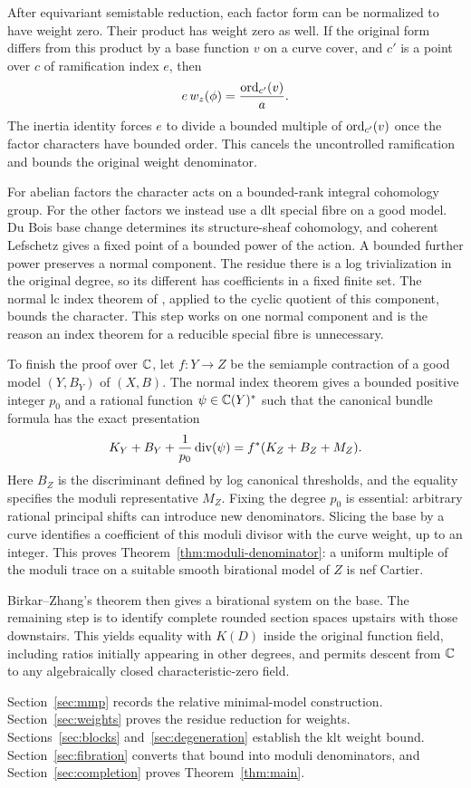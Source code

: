 After equivariant semistable reduction, each factor form can be
normalized to have weight zero. Their product has weight zero as
well. If the original form differs from this product by a base function $v$
on a curve cover, and $c'$ is a point over $c$ of ramification index $e$, then
\[
                         e\,w_z(\phi)=\frac{\operatorname{ord}_{c'}(v)}{a}.
\]
The inertia identity forces $e$ to divide a bounded multiple of
$\operatorname{ord}_{c'}(v)$ once the factor characters have bounded order. This
cancels the uncontrolled ramification and bounds the original weight
denominator.

For abelian factors the character acts on a bounded-rank integral
cohomology group. For the other factors we instead use a dlt special
fibre on a good model. Du Bois base change determines its
structure-sheaf cohomology, and coherent Lefschetz gives a fixed
point of a bounded power of the action. A bounded further power
preserves a normal component. The residue there is a log trivialization
in the original degree, so its different has coefficients in a fixed
finite set. The normal lc index theorem of \cite{U}, applied to the
cyclic quotient of this component, bounds the character. This step
works on one normal component and is the reason an index theorem
for a reducible special fibre is unnecessary.

To finish the proof over $\mathbb C$, let $f:Y\to Z$ be the semiample contraction of a good model
$(Y,B_Y)$ of $(X,B)$. The normal index theorem gives a bounded positive
integer $p_0$ and a rational function $\psi\in\mathbb C(Y)^*$ such that the
canonical bundle formula has the exact presentation
\[
 K_Y+B_Y+\frac1{p_0}\operatorname{div}(\psi)=f^*(K_Z+B_Z+M_Z).
\]
Here $B_Z$ is the discriminant defined by log canonical thresholds,
and the equality specifies the moduli representative $M_Z$.
Fixing the degree $p_0$ is essential: arbitrary rational principal
shifts can introduce new denominators. Slicing the base by a curve
identifies a coefficient of this moduli divisor with the curve weight,
up to an integer. This proves Theorem~\ref{thm:moduli-denominator}:
a uniform multiple of the moduli trace on a suitable smooth birational
model of $Z$ is nef Cartier.

Birkar--Zhang's theorem then gives a birational system on the base.
The remaining step is to identify complete rounded section spaces
upstairs with those downstairs. This yields equality with $K(D)$
inside the original function field, including ratios initially
appearing in other degrees, and permits descent from $\mathbb C$ to any
algebraically closed characteristic-zero field.

Section~\ref{sec:mmp} records the relative minimal-model construction.
Section~\ref{sec:weights} proves the residue reduction for weights.
Sections~\ref{sec:blocks} and~\ref{sec:degeneration} establish the
klt weight bound. Section~\ref{sec:fibration} converts that bound
into moduli denominators, and Section~\ref{sec:completion} proves
Theorem~\ref{thm:main}.
